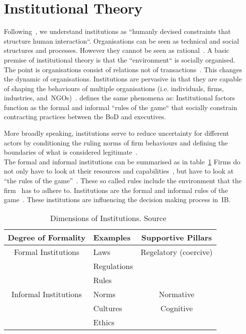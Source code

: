 \section{Institutional Theory}\label{sec:InTh}

Following~\cite{North:1990}, we understand institutions as ``humanly devised constraints that structure human interaction``. 
Organisations can be seen as technical and social structures and processes. 
However they cannot be seen as rational~\cite{Westney:2005}. 
A basic premise of institutional theory is that the ``environment`` is socially organised. 
The point is organisations consist of relations not of transactions~\cite{Westney:2005}. This changes the dynamic of organisations.
Institutions are pervasive in that they are capable of shaping the behaviours of multiple organisations (i.e. individuals, firms, industries, and~\glspl{NGO})~\cite{Peng:2008}.  
\cite{North:1990} defines the same phenomena as:
Institutional factors function as the formal and informal ``rules of the game`` that socially constrain contracting practices between the \gls{BoD} and executives.

More broadly speaking, institutions serve to reduce uncertainty for different actors by conditioning the ruling norms of firm behaviours and defining the boundaries of what is considered legitimate~\cite{Peng:2008}.\\
The formal and informal institutions can be summarised as in table~\ref{tab:peng2008}
Firms do not only have to look at their resources and capabilities~\cite{Barney:1991}, but have to look at ``the rules of the game''~\cite{Scott:1995}. 
These so called rules include the environment that the firm \mne~has to adhere to.
Institutions are the formal and informal rules of the game~\cite{North:1990}. These institutions are influencing the decision making process in~\gls{IB}.

\begin{table}[htb]
  \centering
  \caption[Dimensions of Institutions]{Dimensions of Institutions. Source~\cite{Peng:2008b}} 
  \label{tab:peng2008}
\begin{tabular}{c|l|c} 
  Degree of Formality & Examples & Supportive Pillars\\ 
  \midrule 
  \midrule
  Formal Institutions& Laws&  Regelatory (coercive)\\
  &Regulations&\\
  &Rules&\\
  Informal Institutions&Norms &Normative \\
  & Cultures&Cognitive\\
  &Ethics&\\ 
  \bottomrule
\end{tabular}
\end{table}

